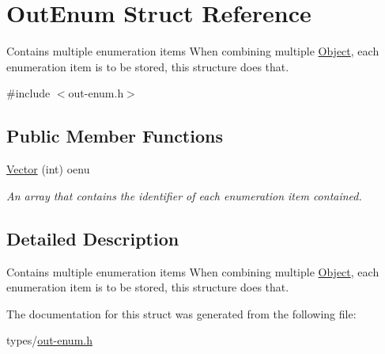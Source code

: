 \hypertarget{struct_out_enum}{}\section{Out\+Enum Struct Reference}
\label{struct_out_enum}


Contains multiple enumeration items When combining multiple \hyperlink{struct_object}{Object}, each enumeration item is to be stored, this structure does that.  




{\ttfamily \#include $<$out-\/enum.\+h$>$}

\subsection*{Public Member Functions}
\begin{DoxyCompactItemize}
\item 
\hyperlink{struct_out_enum_a6fcacac8df97de23968c0629bec3c2b0}{Vector} (int) oenu\hypertarget{struct_out_enum_a6fcacac8df97de23968c0629bec3c2b0}{}\label{struct_out_enum_a6fcacac8df97de23968c0629bec3c2b0}

\begin{DoxyCompactList}\small\item\em An array that contains the identifier of each enumeration item contained. \end{DoxyCompactList}\end{DoxyCompactItemize}


\subsection{Detailed Description}
Contains multiple enumeration items When combining multiple \hyperlink{struct_object}{Object}, each enumeration item is to be stored, this structure does that. 

The documentation for this struct was generated from the following file\+:\begin{DoxyCompactItemize}
\item 
types/\hyperlink{out-enum_8h}{out-\/enum.\+h}\end{DoxyCompactItemize}
